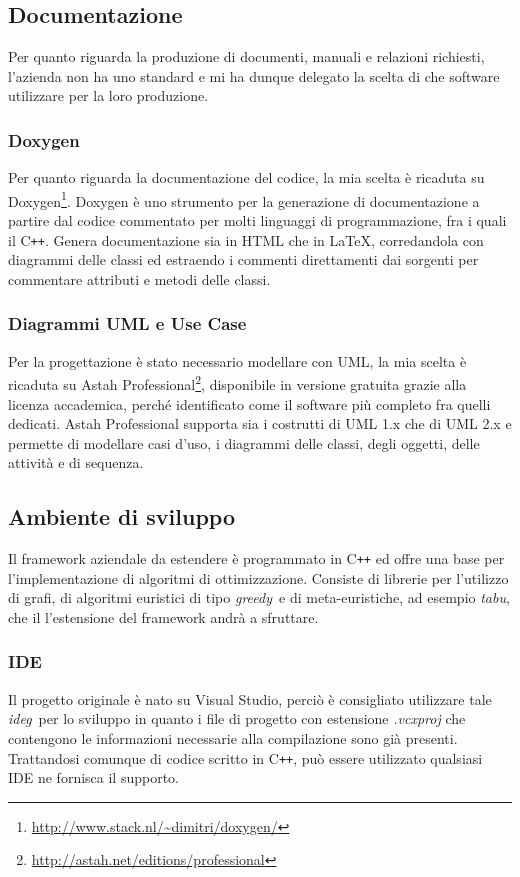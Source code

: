    \subsection{Documentazione}
        Per quanto riguarda la produzione di documenti, manuali e relazioni richiesti, l'azienda non ha uno standard e mi ha dunque delegato la scelta di che software utilizzare per la loro produzione. 
        \subsubsection{Doxygen}
        Per quanto riguarda la documentazione del codice, la mia scelta è ricaduta su Doxygen\footnote{{\color{blue} \url{http://www.stack.nl/~dimitri/doxygen/}}}. Doxygen è uno strumento per la generazione di documentazione a partire dal codice commentato per molti linguaggi di programmazione, fra i quali il C\texttt{++}. Genera documentazione sia in HTML che in \LaTeX, corredandola con diagrammi delle classi ed estraendo i commenti direttamenti dai sorgenti per commentare attributi e metodi delle classi.
        \subsubsection{Diagrammi UML e Use Case}
        Per la progettazione è stato necessario modellare con UML, la mia scelta è ricaduta su Astah Professional\footnote{{\color{blue} \url{http://astah.net/editions/professional}}}, disponibile in versione gratuita grazie alla licenza accademica, perché identificato come il software più completo fra quelli dedicati. Astah Professional supporta sia i costrutti di UML 1.x che di UML 2.x e permette di modellare casi d'uso, i diagrammi delle classi, degli oggetti, delle attività e di sequenza.

    \subsection{Ambiente di sviluppo}

Il framework aziendale da estendere è programmato in C\texttt{++} ed offre una base per l'implementazione di algoritmi di ottimizzazione. Consiste di librerie per l'utilizzo di grafi, di algoritmi euristici di tipo \emph{\gls{greedy}}\glsfirstoccur\ e di meta-euristiche, ad esempio \emph{\gls{tabu}}\glsfirstoccur, che il l'estensione del framework andrà a sfruttare.

\subsubsection{IDE}
Il progetto originale è nato su Visual Studio, perciò è consigliato utilizzare tale \emph{\gls{ideg}}\glsfirstoccur\  per lo sviluppo in quanto i file di progetto con estensione \textit{.vcxproj} che contengono le informazioni necessarie alla compilazione sono già presenti.\\ Trattandosi comunque di codice scritto in C\texttt{++}, può essere utilizzato qualsiasi IDE ne fornisca il supporto.

